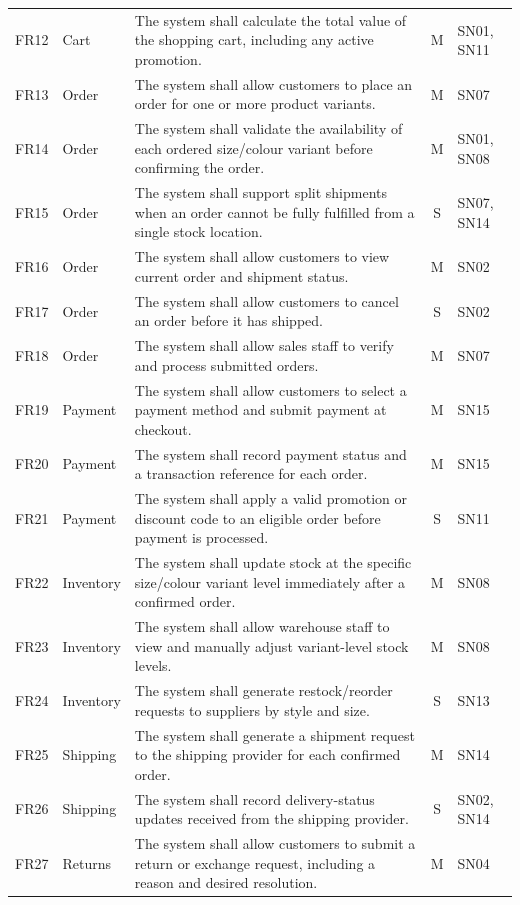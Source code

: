 \documentclass[11pt,a4paper,oneside]{extreport}
\begin{document}
{\begin{xltabular}{\textwidth}{@{}l L{1.7cm} Y c L{1.55cm}@{}}
FR12 & Cart & The system shall calculate the total value of the shopping cart, including any active promotion. & M & SN01, SN11 \\
FR13 & Order & The system shall allow customers to place an order for one or more product variants. & M & SN07 \\
FR14 & Order & The system shall validate the availability of each ordered size/colour variant before confirming the order. & M & SN01, SN08 \\
FR15 & Order & The system shall support split shipments when an order cannot be fully fulfilled from a single stock location. & S & SN07, SN14 \\
FR16 & Order & The system shall allow customers to view current order and shipment status. & M & SN02 \\
FR17 & Order & The system shall allow customers to cancel an order before it has shipped. & S & SN02 \\
FR18 & Order & The system shall allow sales staff to verify and process submitted orders. & M & SN07 \\
FR19 & Payment & The system shall allow customers to select a payment method and submit payment at checkout. & M & SN15 \\
FR20 & Payment & The system shall record payment status and a transaction reference for each order. & M & SN15 \\
FR21 & Payment & The system shall apply a valid promotion or discount code to an eligible order before payment is processed. & S & SN11 \\
FR22 & Inventory & The system shall update stock at the specific size/colour variant level immediately after a confirmed order. & M & SN08 \\
FR23 & Inventory & The system shall allow warehouse staff to view and manually adjust variant-level stock levels. & M & SN08 \\
FR24 & Inventory & The system shall generate restock/reorder requests to suppliers by style and size. & S & SN13 \\
FR25 & Shipping & The system shall generate a shipment request to the shipping provider for each confirmed order. & M & SN14 \\
FR26 & Shipping & The system shall record delivery-status updates received from the shipping provider. & S & SN02, SN14 \\
FR27 & Returns & The system shall allow customers to submit a return or exchange request, including a reason and desired resolution. & M & SN04 \\

\end{xltabular}}
\end{document}
